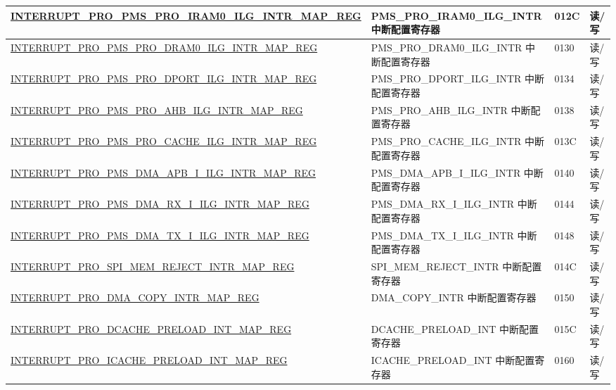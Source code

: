\begin{longtable}{ | m{9.3cm} | m{9.2cm} | m{1.3cm} | m{1.2cm} | }
\hyperref[regdesc:INTERRUPTPROPMSPROIRAM0ILGINTRMAPREG]{INTERRUPT\_PRO\_PMS\_PRO\_IRAM0\_ILG\_INTR\_MAP\_REG} & PMS\_PRO\_IRAM0\_ILG\_INTR 中断配置寄存器 & \hexprefix{}012C &读/写 \\ \hline
\hyperref[regdesc:INTERRUPTPROPMSPRODRAM0ILGINTRMAPREG]{INTERRUPT\_PRO\_PMS\_PRO\_DRAM0\_ILG\_INTR\_MAP\_REG} & PMS\_PRO\_DRAM0\_ILG\_INTR 中断配置寄存器 & \hexprefix{}0130 &读/写 \\ \hline
\hyperref[regdesc:INTERRUPTPROPMSPRODPORTILGINTRMAPREG]{INTERRUPT\_PRO\_PMS\_PRO\_DPORT\_ILG\_INTR\_MAP\_REG} & PMS\_PRO\_DPORT\_ILG\_INTR 中断配置寄存器 & \hexprefix{}0134 &读/写 \\ \hline
\hyperref[regdesc:INTERRUPTPROPMSPROAHBILGINTRMAPREG]{INTERRUPT\_PRO\_PMS\_PRO\_AHB\_ILG\_INTR\_MAP\_REG} & PMS\_PRO\_AHB\_ILG\_INTR 中断配置寄存器 & \hexprefix{}0138 &读/写 \\ \hline
\hyperref[regdesc:INTERRUPTPROPMSPROCACHEILGINTRMAPREG]{INTERRUPT\_PRO\_PMS\_PRO\_CACHE\_ILG\_INTR\_MAP\_REG} & PMS\_PRO\_CACHE\_ILG\_INTR 中断配置寄存器 & \hexprefix{}013C &读/写 \\ \hline
\hyperref[regdesc:INTERRUPTPROPMSDMAAPBIILGINTRMAPREG]{INTERRUPT\_PRO\_PMS\_DMA\_APB\_I\_ILG\_INTR\_MAP\_REG} & PMS\_DMA\_APB\_I\_ILG\_INTR 中断配置寄存器 & \hexprefix{}0140 &读/写 \\ \hline
\hyperref[regdesc:INTERRUPTPROPMSDMARXIILGINTRMAPREG]{INTERRUPT\_PRO\_PMS\_DMA\_RX\_I\_ILG\_INTR\_MAP\_REG} & PMS\_DMA\_RX\_I\_ILG\_INTR 中断配置寄存器 & \hexprefix{}0144 &读/写 \\ \hline
\hyperref[regdesc:INTERRUPTPROPMSDMATXIILGINTRMAPREG]{INTERRUPT\_PRO\_PMS\_DMA\_TX\_I\_ILG\_INTR\_MAP\_REG} & PMS\_DMA\_TX\_I\_ILG\_INTR 中断配置寄存器 & \hexprefix{}0148 &读/写 \\ \hline
\hyperref[regdesc:INTERRUPTPROSPIMEMREJECTINTRMAPREG]{INTERRUPT\_PRO\_SPI\_MEM\_REJECT\_INTR\_MAP\_REG} & SPI\_MEM\_REJECT\_INTR 中断配置寄存器 & \hexprefix{}014C &读/写 \\ \hline
\hyperref[regdesc:INTERRUPTPRODMACOPYINTRMAPREG]{INTERRUPT\_PRO\_DMA\_COPY\_INTR\_MAP\_REG} & DMA\_COPY\_INTR 中断配置寄存器 & \hexprefix{}0150 &读/写 \\ \hline
\hyperref[regdesc:INTERRUPTPRODCACHEPRELOADINTMAPREG]{INTERRUPT\_PRO\_DCACHE\_PRELOAD\_INT\_MAP\_REG} & DCACHE\_PRELOAD\_INT 中断配置寄存器 & \hexprefix{}015C &读/写 \\ \hline
\hyperref[regdesc:INTERRUPTPROICACHEPRELOADINTMAPREG]{INTERRUPT\_PRO\_ICACHE\_PRELOAD\_INT\_MAP\_REG} & ICACHE\_PRELOAD\_INT 中断配置寄存器 & \hexprefix{}0160 &读/写 \\ \hline

\end{longtable}

